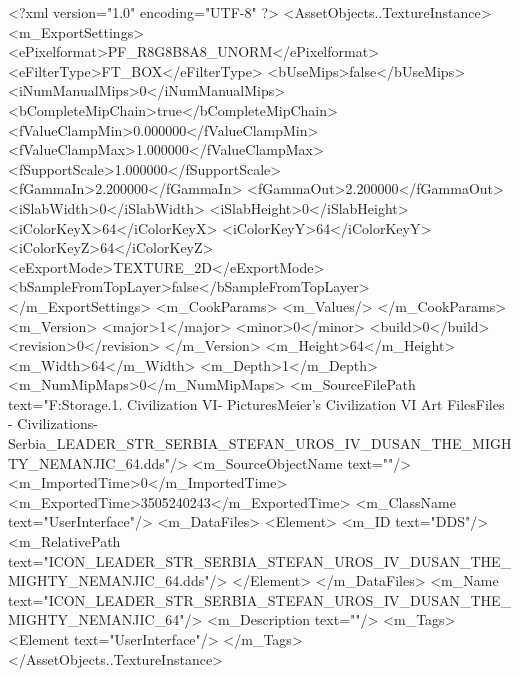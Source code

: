 <?xml version="1.0" encoding="UTF-8" ?>
<AssetObjects..TextureInstance>
	<m_ExportSettings>
		<ePixelformat>PF_R8G8B8A8_UNORM</ePixelformat>
		<eFilterType>FT_BOX</eFilterType>
		<bUseMips>false</bUseMips>
		<iNumManualMips>0</iNumManualMips>
		<bCompleteMipChain>true</bCompleteMipChain>
		<fValueClampMin>0.000000</fValueClampMin>
		<fValueClampMax>1.000000</fValueClampMax>
		<fSupportScale>1.000000</fSupportScale>
		<fGammaIn>2.200000</fGammaIn>
		<fGammaOut>2.200000</fGammaOut>
		<iSlabWidth>0</iSlabWidth>
		<iSlabHeight>0</iSlabHeight>
		<iColorKeyX>64</iColorKeyX>
		<iColorKeyY>64</iColorKeyY>
		<iColorKeyZ>64</iColorKeyZ>
		<eExportMode>TEXTURE_2D</eExportMode>
		<bSampleFromTopLayer>false</bSampleFromTopLayer>
	</m_ExportSettings>
	<m_CookParams>
		<m_Values/>
	</m_CookParams>
	<m_Version>
		<major>1</major>
		<minor>0</minor>
		<build>0</build>
		<revision>0</revision>
	</m_Version>
	<m_Height>64</m_Height>
	<m_Width>64</m_Width>
	<m_Depth>1</m_Depth>
	<m_NumMipMaps>0</m_NumMipMaps>
	<m_SourceFilePath text="F:\Mod Storage\2.1. Civilization VI\Mods\Archive - Pictures\Sid Meier's Civilization VI Art Files\Art Files - Civilizations\Civilization - Serbia\ICON_LEADER_STR_SERBIA_STEFAN_UROS_IV_DUSAN_THE_MIGHTY_NEMANJIC_64.dds"/>
	<m_SourceObjectName text=""/>
	<m_ImportedTime>0</m_ImportedTime>
	<m_ExportedTime>3505240243</m_ExportedTime>
	<m_ClassName text="UserInterface"/>
	<m_DataFiles>
		<Element>
			<m_ID text="DDS"/>
			<m_RelativePath text="ICON_LEADER_STR_SERBIA_STEFAN_UROS_IV_DUSAN_THE_MIGHTY_NEMANJIC_64.dds"/>
		</Element>
	</m_DataFiles>
	<m_Name text="ICON_LEADER_STR_SERBIA_STEFAN_UROS_IV_DUSAN_THE_MIGHTY_NEMANJIC_64"/>
	<m_Description text=""/>
	<m_Tags>
		<Element text="UserInterface"/>
	</m_Tags>
</AssetObjects..TextureInstance>

